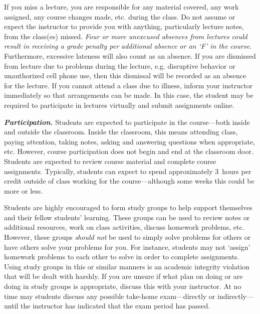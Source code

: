 \documentclass[11pt,letterpaper]{article}
\begin{document}
If you miss a lecture, you are responsible for any material covered, any work assigned, any course changes made, etc. during the class. Do not assume or expect the instructor to provide you with anything, particularly lecture notes, from the class(es) missed. {\itshape Four or more unexcused absences from lectures could result in receiving a grade penalty per additional absence or an `F' in the course.} Furthermore, excessive lateness will also count as an absence. If you are dismissed from lecture due to problems during the lecture, e.g. disruptive behavior or unauthorized cell phone use, then this dismissal will be recorded as an absence for the lecture. If you cannot attend a class due to illness, inform your instructor immediately so that arrangements can be made. In this case, the student may be required to participate in lectures virtually and submit assignments online. \pspace

{\itshape\bfseries\color{stacred}Participation.} Students are expected to participate in the course---both inside and outside the classroom. Inside the classroom, this means attending class, paying attention, taking notes, asking and answering questions when appropriate, etc. However, course participation does not begin and end at the classroom door. Students are expected to review course material and complete course assignments. Typically, students can expect to spend approximately 3~hours per credit outside of class working for the course---although some weeks this could be more or less. \pspace

Students are highly encouraged to form study groups to help support themselves and their fellow students' learning. These groups can be used to review notes or additional resources, work on class activities, discuss homework problems, etc. However, these groups {\itshape should not} be used to simply solve problems for others or have others solve your problems for you. For instance, students may not `assign' homework problems to each other to solve in order to complete assignments. Using study groups in this or similar manners is an academic integrity violation that will be dealt with harshly. If you are unsure if what plan on doing or are doing in study groups is appropriate, discuss this with your instructor. At no time may students discuss any possible take-home exam---directly or indirectly---until the instructor has indicated that the exam period has passed. \sectionbreak
\end{document}
